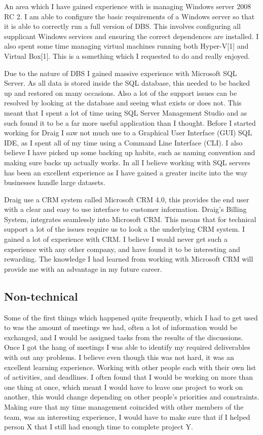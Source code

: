 \documentclass[paper=a4, fontsize=11pt]{scrartcl}	%
\begin{document}
An area which I have gained experience with is managing Windows server 2008 RC 2. I am able to configure the basic requirements of a Windows server so that it is able to correctly run a full version of DBS. This involves configuring all supplicant Windows services and ensuring the correct dependences are installed. I also spent some time managing virtual machines running both Hyper-V[1] and Virtual Box[1]. This is a something which I requested to do and really enjoyed.

Due to the nature of DBS I gained massive experience with Microsoft SQL Server. As all data is stored inside the SQL database, this needed to be backed up and restored on many occasions. Also a lot of the support issues can be resolved by looking at the database and seeing what exists or does not. This meant that I spent a lot of time using SQL Server Management Studio and as such found it to be a far more useful application than I thought. Before I started working for Draig I saw not much use to a Graphical User Interface (GUI) SQL IDE, as I spent all of my time using a Command Line Interface (CLI). I also believe I have picked up some backing up habits, such as naming convention and making sure backs up actually works. In all I believe working with SQL servers has been an excellent experience as I have gained a greater incite into the way businesses handle large datasets. 

Draig use a CRM system called Microsoft CRM 4.0, this provides the end user with a clear and easy to use interface to customer information. Draig's Billing System, integrates seamlessly into Microsoft CRM. This means that for technical support a lot of the issues require us to look a the underlying CRM system. I gained a lot of experience with CRM. I believe I would never get such a experience with any other company, and have found it to be interesting and rewarding. The knowledge I had learned from working with Microsoft CRM will provide me with an advantage in my future career. 

\subsection{Non-technical}
Some of the first things which happened quite frequently, which I had to get used to was the amount of meetings we had, often a lot of information would be exchanged, and I would be assigned tasks from the results of the discussions. Once I got the hang of meetings I was able to identify my required deliverables with out any problems. I believe even though this was not hard, it was an excellent learning experience. Working with other people each with their own list of activities, and deadlines. I often found that I would be working on more than one thing at once, which meant I would have to leave one project to work on another, this would change depending on other people's priorities and constraints. Making sure that my time management coincided with other members of the team, was an interesting experience, I would have to make sure that if I helped person X that I still had enough time to complete project Y.
\end{document}
